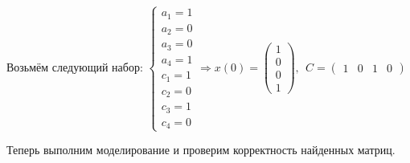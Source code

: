 \begin{par}
\begin{flushleft}
Возьмём следующий набор: $\left\lbrace \begin{array}{c}
a_1 =1\\
a_2 =0\\
a_3 =0\\
a_4 =1\\
c_1 =1\\
c_2 =0\\
c_3 =1\\
c_4 =0
\end{array}\right.\Rightarrow x(0)=\left(\begin{array}{c}
1\\
0\\
0\\
1
\end{array}\right),~~C=\left(\begin{array}{cccc}
1 & 0 & 1 & 0
\end{array}\right)$
\end{flushleft}
\end{par}

\begin{par}
\begin{flushleft}
Теперь выполним моделирование и проверим корректность найденных матриц.
\end{flushleft}
\end{par}

